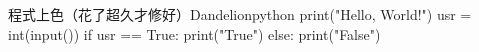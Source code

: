 \documentclass{article}
\begin{document}

\begin{mintbox}{程式上色（花了超久才修好）}{Dandelion}{python}
print("Hello, World!")
usr = int(input())
if usr == True:
    print("True")
else:
    print("False")
\end{mintbox}

\begin{large}

\end{large}
\end{document}
